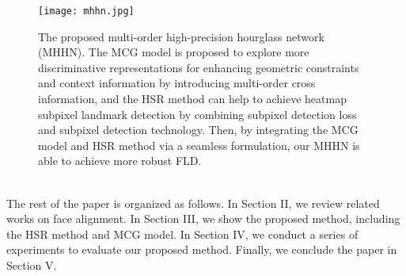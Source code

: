 \documentclass[journal]{IEEEtran}
\begin{document}
\begin{figure*}
	\begin{center}
\texttt{[image: mhhn.jpg]}
	\end{center}
	\caption{The proposed multi-order high-precision hourglass network (MHHN). The MCG model is proposed to explore more discriminative representations for enhancing geometric constraints and context information by introducing multi-order cross information, and the HSR method can help to achieve heatmap subpixel landmark detection by combining subpixel detection loss and subpixel detection technology. Then, by integrating the MCG model and HSR method via a seamless formulation, our MHHN is able to achieve more robust FLD.}
	\label{figstructure}
\end{figure*}
\\\indent The rest of the paper is organized as follows. In Section II, we review related works on face alignment. In Section III, we show the proposed method, including the HSR method and MCG model. In Section IV, we conduct a series of experiments to evaluate our proposed method. Finally, we conclude the paper in Section V.
\end{document}
